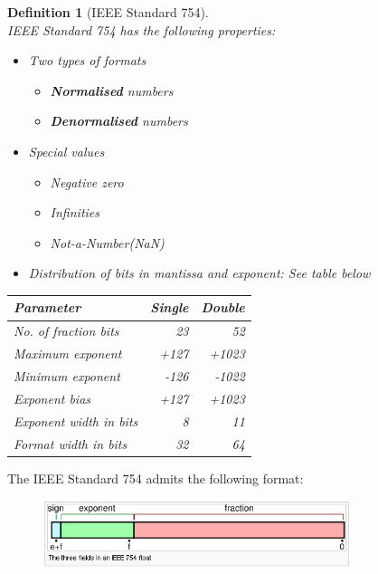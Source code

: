 \documentclass[12pt]{article}
\newtheorem{definition}{Definition}[section]
\theoremstyle{definition}
\begin{document}
\begin{definition}[IEEE Standard 754]
\hfill\\\normalfont IEEE Standard 754 has the following properties:
\begin{itemize}
  \item Two types of formats
  \begin{itemize}
    \item \textbf{Normalised} numbers
    \item \textbf{Denormalised} numbers
  \end{itemize}
  \item Special values
  \begin{itemize}
    \item Negative zero
    \item Infinities
    \item Not-a-Number(NaN)
  \end{itemize}
  \item Distribution of bits in mantissa and exponent: See table below
\end{itemize}
\begin{table}[h]
\centering
\begin{tabular}{|l|r|r|}
\hline
Parameter&Single&Double\\\hline
No. of fraction bits  &23&52\\\hline
Maximum exponent      &+127&+1023\\\hline
Minimum exponent      &-126&-1022\\\hline
Exponent bias         &+127&+1023\\\hline
Exponent width in bits&8&11\\\hline
Format width in bits  &32&64\\\hline
\end{tabular}
\end{table}
\end{definition}
\clearpage
The IEEE Standard 754 admits the following format:
\begin{figure}[h]
\centering
\includegraphics[width = 0.8\textwidth]{2_1.png}
\end{figure}
\end{document}
